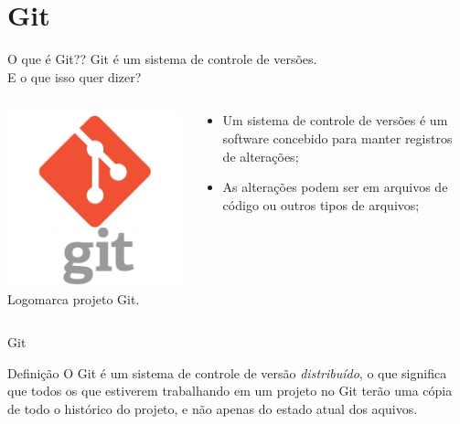 \documentclass{beamer}
\begin{document}
\section{Git}
\begin{frame}{O que é Git??}
   Git é um sistema de controle de versões.\\
   E o que isso quer dizer?
  \begin{columns}
    \begin{column}{0.4\textwidth}
       \includegraphics[height=0.4\paperheight]{git_logo.png} \\
       \tiny{Logomarca projeto Git}.
    \end{column}
    \begin{column}{0.4\textwidth}
      \begin{itemize}
        \item Um sistema de controle de versões é um software concebido 
para manter registros de alterações;
	 \item As alterações podem ser em arquivos de código ou outros 
tipos de arquivos;
      \end{itemize} 
    \end{column}    
  \end{columns}
\end{frame}
\begin{frame}{Git}
  \begin{block}{Definição}
    O Git é um sistema de controle de versão \textit{distribuído}, o que 
significa que todos os que estiverem trabalhando em um projeto no Git terão uma 
cópia de todo o histórico do projeto, e não apenas do estado atual dos aquivos.
  \end{block}
  \tiny{\cite{beer2015github}}

\end{frame}
\end{document}
